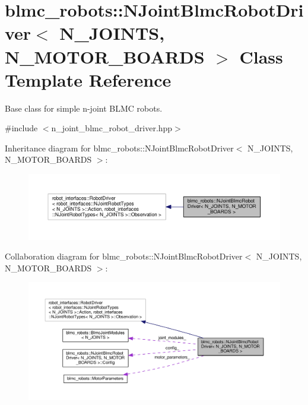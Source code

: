 \hypertarget{classblmc__robots_1_1NJointBlmcRobotDriver}{}\section{blmc\+\_\+robots\+:\+:N\+Joint\+Blmc\+Robot\+Driver$<$ N\+\_\+\+J\+O\+I\+N\+TS, N\+\_\+\+M\+O\+T\+O\+R\+\_\+\+B\+O\+A\+R\+DS $>$ Class Template Reference}
\label{classblmc__robots_1_1NJointBlmcRobotDriver}


Base class for simple n-\/joint B\+L\+MC robots.  




{\ttfamily \#include $<$n\+\_\+joint\+\_\+blmc\+\_\+robot\+\_\+driver.\+hpp$>$}



Inheritance diagram for blmc\+\_\+robots\+:\+:N\+Joint\+Blmc\+Robot\+Driver$<$ N\+\_\+\+J\+O\+I\+N\+TS, N\+\_\+\+M\+O\+T\+O\+R\+\_\+\+B\+O\+A\+R\+DS $>$\+:
\nopagebreak
\begin{figure}[H]
\begin{center}
\leavevmode
\includegraphics[width=350pt]{classblmc__robots_1_1NJointBlmcRobotDriver__inherit__graph}
\end{center}
\end{figure}


Collaboration diagram for blmc\+\_\+robots\+:\+:N\+Joint\+Blmc\+Robot\+Driver$<$ N\+\_\+\+J\+O\+I\+N\+TS, N\+\_\+\+M\+O\+T\+O\+R\+\_\+\+B\+O\+A\+R\+DS $>$\+:
\nopagebreak
\begin{figure}[H]
\begin{center}
\leavevmode
\includegraphics[width=350pt]{classblmc__robots_1_1NJointBlmcRobotDriver__coll__graph}
\end{center}
\end{figure}

